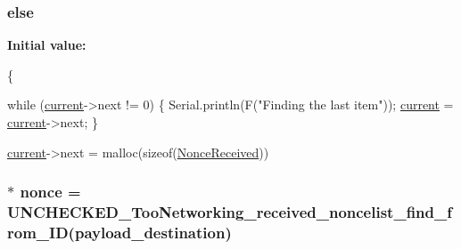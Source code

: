 \subsubsection[{\texorpdfstring{else}{else}}]{\setlength{\rightskip}{0pt plus 5cm}else}\hypertarget{group__UNCHECKED__TooNetworking__SIMPLE__BUFFER_ga0544c3fe466e421738dae463968b70ba}{}\label{group__UNCHECKED__TooNetworking__SIMPLE__BUFFER_ga0544c3fe466e421738dae463968b70ba}
{\bfseries Initial value\+:}
\begin{DoxyCode}
\{
    
    \textcolor{keywordflow}{while} (\hyperlink{group__UNCHECKED__TooNetworking__SIMPLE__BUFFER_gae8b515cceb310a575b6c2677ba93ea7e}{current}->next != 0) \{  
      Serial.println(F(\textcolor{stringliteral}{"Finding the last item"}));
      \hyperlink{group__UNCHECKED__TooNetworking__SIMPLE__BUFFER_gae8b515cceb310a575b6c2677ba93ea7e}{current} = \hyperlink{group__UNCHECKED__TooNetworking__SIMPLE__BUFFER_gae8b515cceb310a575b6c2677ba93ea7e}{current}->next;
    \}

    \hyperlink{group__UNCHECKED__TooNetworking__SIMPLE__BUFFER_gae8b515cceb310a575b6c2677ba93ea7e}{current}->next = malloc(\textcolor{keyword}{sizeof}(\hyperlink{structNonceReceived}{NonceReceived}))
\end{DoxyCode}
\subsubsection[{\texorpdfstring{nonce}{nonce}}]{$\ast$ nonce = U\+N\+C\+H\+E\+C\+K\+E\+D\+\_\+\+Too\+Networking\+\_\+received\+\_\+noncelist\+\_\+find\+\_\+from\+\_\+\+ID({\bf payload\+\_\+destination})}\hypertarget{group__UNCHECKED__TooNetworking__SIMPLE__BUFFER_ga8fc64ce47dc28f47b3317ae1051e4359}{}\label{group__UNCHECKED__TooNetworking__SIMPLE__BUFFER_ga8fc64ce47dc28f47b3317ae1051e4359}

